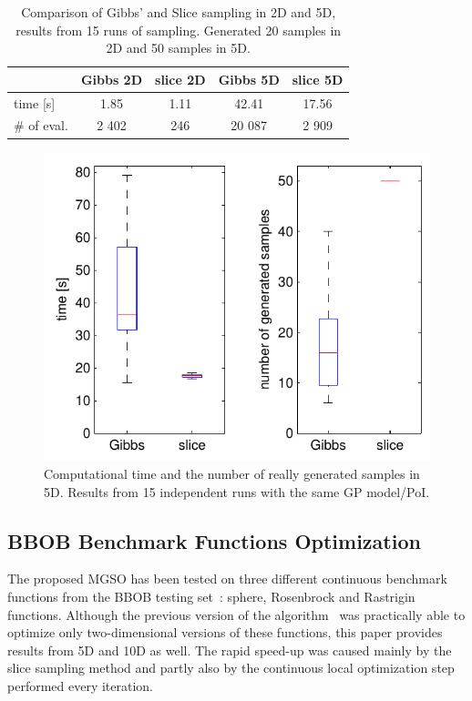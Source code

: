 \documentclass{itatnew}
\begin{document}
\begin{table}%
\begin{center}
{\small
\caption{Comparison of Gibbs' and Slice sampling in 2D and 5D, results from 15 runs of sampling. Generated 20 samples in 2D and 50 samples in 5D.}
\vspace{1ex}
\label{tab:sampling}
\begin{tabular}{l | c c c c}
\hline
            & Gibbs 2D  & slice 2D      & Gibbs 5D      & slice 5D \\
\hline
time [s]    & 1.85      & 1.11          & 42.41         & 17.56 \\
\# of eval. & 2 402     & 246           & 20 087        & 2 909 \\
\hline
\end{tabular}
} %
\end{center}
\end{table}

\begin{figure}
  \centering
  \includegraphics[width=0.9\linewidth]{sampling_time_popsize_5D}
  {\small
  \caption{Computational time and the number of really generated samples in 5D. Results from 15 independent runs with the same GP model/PoI.
  \label{fig:sampling}
  }
  }
\end{figure}

\subsection{BBOB Benchmark Functions Optimization}

The proposed MGSO has been tested on three different continuous benchmark functions from the BBOB testing set~\cite{hansen_real_2009}: sphere, Rosenbrock and Rastrigin functions. Although the previous version of the algorithm~\cite{bajer_model_2013} was practically able to optimize only two-dimensional versions of these functions, this paper provides results from 5D and 10D as well. The rapid speed-up was caused mainly by the slice sampling method and partly also by the continuous local optimization step performed every iteration.
\end{document}
